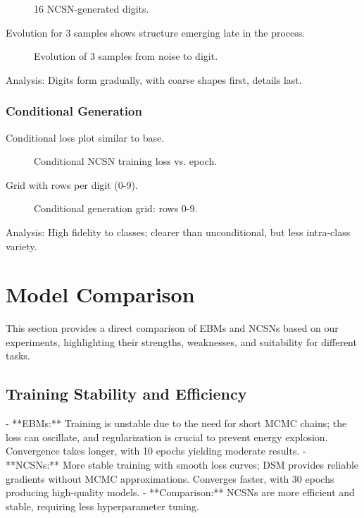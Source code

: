 \documentclass[a4paper,12pt]{article}
\begin{document}
\begin{figure}[H]
\centering
{}
\caption{16 NCSN-generated digits.}
\label{fig:ncsn_uncond}
\end{figure}

Evolution for 3 samples shows structure emerging late in the process.

\begin{figure}[H]
\centering
{}
\caption{Evolution of 3 samples from noise to digit.}
\label{fig:ncsn_evolution}
\end{figure}

Analysis: Digits form gradually, with coarse shapes first, details last.

\subsubsection{Conditional Generation}
Conditional loss plot similar to base.

\begin{figure}[H]
\centering
{}
\caption{Conditional NCSN training loss vs. epoch.}
\label{fig:ncsn_cond_loss}
\end{figure}

Grid with rows per digit (0-9).

\begin{figure}[H]
\centering
{}
\caption{Conditional generation grid: rows 0-9.}
\label{fig:ncsn_cond_grid}
\end{figure}

Analysis: High fidelity to classes; clearer than unconditional, but less intra-class variety.

\section{Model Comparison}
This section provides a direct comparison of EBMs and NCSNs based on our experiments, highlighting their strengths, weaknesses, and suitability for different tasks.

\subsection{Training Stability and Efficiency}
- **EBMs:** Training is unstable due to the need for short MCMC chains; the loss can oscillate, and regularization is crucial to prevent energy explosion. Convergence takes longer, with 10 epochs yielding moderate results.
- **NCSNs:** More stable training with smooth loss curves; DSM provides reliable gradients without MCMC approximations. Converges faster, with 30 epochs producing high-quality models.
- **Comparison:** NCSNs are more efficient and stable, requiring less hyperparameter tuning.
\end{document}

